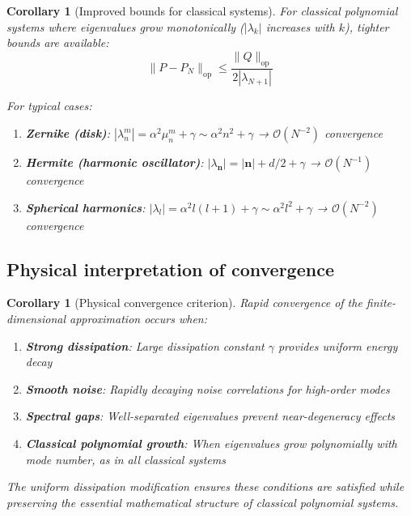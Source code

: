 \documentclass[a4paper,12pt]{article}
\newtheorem{corollary}[theorem]{Corollary}
\newcommand{\op}{\text{op}}
\begin{document}
\begin{corollary}[Improved bounds for classical systems]
For classical polynomial systems where eigenvalues grow monotonically ($|\lambda_k|$ increases with $k$), tighter bounds are available:
\begin{equation}
\|P - P_N\|_{\op} \leq \frac{\|Q\|_{\op}}{2|\lambda_{N+1}|}
\end{equation}

For typical cases:
\begin{enumerate}
\item \textbf{Zernike (disk)}: $|\lambda_n^m| = \alpha^2 \mu_n^m + \gamma \sim \alpha^2 n^2 + \gamma$ → $\mathcal{O}(N^{-2})$ convergence
\item \textbf{Hermite (harmonic oscillator)}: $|\lambda_{\mathbf{n}}| = |\mathbf{n}| + d/2 + \gamma$ → $\mathcal{O}(N^{-1})$ convergence  
\item \textbf{Spherical harmonics}: $|\lambda_l| = \alpha^2 l(l+1) + \gamma \sim \alpha^2 l^2 + \gamma$ → $\mathcal{O}(N^{-2})$ convergence
\end{enumerate}
\end{corollary}

\subsection{Physical interpretation of convergence}

\begin{corollary}[Physical convergence criterion]\label{cor:physical_convergence}
Rapid convergence of the finite-dimensional approximation occurs when:
\begin{enumerate}
\item \textbf{Strong dissipation}: Large dissipation constant $\gamma$ provides uniform energy decay
\item \textbf{Smooth noise}: Rapidly decaying noise correlations for high-order modes
\item \textbf{Spectral gaps}: Well-separated eigenvalues prevent near-degeneracy effects
\item \textbf{Classical polynomial growth}: When eigenvalues grow polynomially with mode number, as in all classical systems
\end{enumerate}
The uniform dissipation modification ensures these conditions are satisfied while preserving the essential mathematical structure of classical polynomial systems.
\end{corollary}

\end{document}

